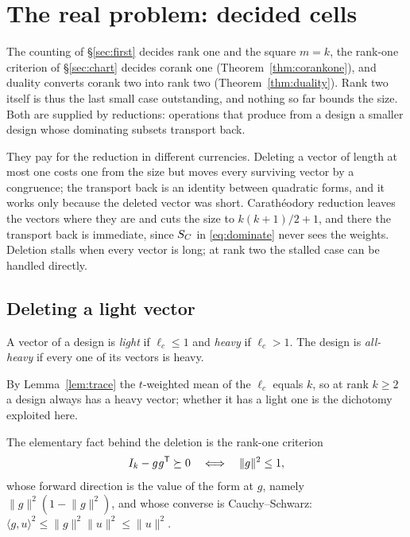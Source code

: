 \section{The real problem: decided cells}\label{sec:real}

The counting of \S\ref{sec:first} decides rank one and the square $m=k$,
the rank-one criterion of \S\ref{sec:chart} decides corank one
(Theorem~\ref{thm:corankone}), and duality converts corank two into rank
two (Theorem~\ref{thm:duality}).  Rank two itself is thus the last small
case outstanding, and nothing so far bounds the size.  Both are supplied
by reductions: operations that produce from a design a smaller design
whose dominating subsets transport back.

They pay for the reduction in different currencies.  Deleting a vector of
length at most one costs one from the size but moves every surviving
vector by a congruence; the transport back is an identity between
quadratic forms, and it works only
because the deleted vector was short.  Carath\'eodory reduction leaves the
vectors where they are and cuts the size to $k(k+1)/2+1$, and there the
transport back is immediate, since $S_{C}$ in \eqref{eq:dominate} never
sees the weights.  Deletion stalls when every vector is long; at rank two
the stalled case can be handled directly.

\subsection{Deleting a light vector}\label{sec:light}

\begin{definition}\label{def:light}
A vector of a design is \emph{light} if $\ell_c\le1$ and \emph{heavy} if
$\ell_c>1$.  The design is \emph{all-heavy} if every one of its vectors is
heavy.
\end{definition}

By Lemma~\ref{lem:trace} the $t$-weighted mean of the $\ell_c$ equals $k$,
so at rank $k\ge2$ a design always has a heavy vector; whether it has a
light one is the dichotomy exploited here.

The elementary fact behind the deletion is the rank-one criterion
\begin{equation}\label{eq:schurone}
  I_k-g^{\vphantom{\mathsf{T}}}g\tp\psd0
  \quad\Longleftrightarrow\quad
  \lVert g\rVert^2\le1 ,
\end{equation}
whose forward direction is the value of the form at $g$, namely
$\lVert g\rVert^2(1-\lVert g\rVert^2)$, and whose converse is
Cauchy--Schwarz: $\langle g,u\rangle^2\le\lVert g\rVert^2\lVert
u\rVert^2\le\lVert u\rVert^2$.

